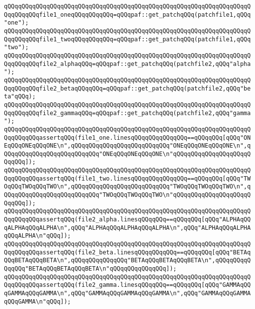 \newline
\verb|qQQqqQQqqQQqqQQqqQQqqQQqqQQqqQQqqQQqqQQqqQQqqQQqqQQqqQQqqQQqqQQqqQQqqQQqqQQqqQQqfile1_oneqQQqqQQqqQQq=qQQqpaf::get_patchqQQq(patchfile1,qQQq"one");|\newline
\verb|qQQqqQQqqQQqqQQqqQQqqQQqqQQqqQQqqQQqqQQqqQQqqQQqqQQqqQQqqQQqqQQqqQQqqQQqqQQqqQQqfile1_twoqQQqqQQqqQQq=qQQqpaf::get_patchqQQq(patchfile1,qQQq"two");|\newline
\newline
\verb|qQQqqQQqqQQqqQQqqQQqqQQqqQQqqQQqqQQqqQQqqQQqqQQqqQQqqQQqqQQqqQQqqQQqqQQqqQQqqQQqfile2_alphaqQQq=qQQqpaf::get_patchqQQq(patchfile2,qQQq"alpha");|\newline
\verb|qQQqqQQqqQQqqQQqqQQqqQQqqQQqqQQqqQQqqQQqqQQqqQQqqQQqqQQqqQQqqQQqqQQqqQQqqQQqqQQqfile2_betaqQQqqQQq=qQQqpaf::get_patchqQQq(patchfile2,qQQq"beta"qQQq);|\newline
\verb|qQQqqQQqqQQqqQQqqQQqqQQqqQQqqQQqqQQqqQQqqQQqqQQqqQQqqQQqqQQqqQQqqQQqqQQqqQQqqQQqfile2_gammaqQQq=qQQqpaf::get_patchqQQq(patchfile2,qQQq"gamma");|\newline
\newline
\verb|qQQqqQQqqQQqqQQqqQQqqQQqqQQqqQQqqQQqqQQqqQQqqQQqqQQqqQQqqQQqqQQqqQQqqQQqqQQqqQQqassertqQQq(file1_one.linesqQQqqQQqqQQqqQQq==qQQqqQQq[qQQq"ONEqQQqONEqQQqONE\n",qQQqqQQqqQQqqQQqqQQqqQQqqQQq"ONEqQQqONEqQQqONE\n",qQQqqQQqqQQqqQQqqQQqqQQqqQQq"ONEqQQqONEqQQqONE\n"qQQqqQQqqQQqqQQqqQQqqQQqqQQq]);|\newline
\verb|qQQqqQQqqQQqqQQqqQQqqQQqqQQqqQQqqQQqqQQqqQQqqQQqqQQqqQQqqQQqqQQqqQQqqQQqqQQqqQQqassertqQQq(file1_two.linesqQQqqQQqqQQqqQQq==qQQqqQQq[qQQq"TWOqQQqTWOqQQqTWO\n",qQQqqQQqqQQqqQQqqQQqqQQqqQQq"TWOqQQqTWOqQQqTWO\n",qQQqqQQqqQQqqQQqqQQqqQQqqQQq"TWOqQQqTWOqQQqTWO\n"qQQqqQQqqQQqqQQqqQQqqQQqqQQq]);|\newline
\newline
\verb|qQQqqQQqqQQqqQQqqQQqqQQqqQQqqQQqqQQqqQQqqQQqqQQqqQQqqQQqqQQqqQQqqQQqqQQqqQQqqQQqassertqQQq(file2_alpha.linesqQQqqQQq==qQQqqQQq[qQQq"ALPHAqQQqALPHAqQQqALPHA\n",qQQq"ALPHAqQQqALPHAqQQqALPHA\n",qQQq"ALPHAqQQqALPHAqQQqALPHA\n"qQQq]);|\newline
\verb|qQQqqQQqqQQqqQQqqQQqqQQqqQQqqQQqqQQqqQQqqQQqqQQqqQQqqQQqqQQqqQQqqQQqqQQqqQQqqQQqassertqQQq(file2_beta.linesqQQqqQQqqQQq==qQQqqQQq[qQQq"BETAqQQqBETAqQQqBETA\n",qQQqqQQqqQQqqQQq"BETAqQQqBETAqQQqBETA\n",qQQqqQQqqQQqqQQq"BETAqQQqBETAqQQqBETA\n"qQQqqQQqqQQqqQQq]);|\newline
\verb|qQQqqQQqqQQqqQQqqQQqqQQqqQQqqQQqqQQqqQQqqQQqqQQqqQQqqQQqqQQqqQQqqQQqqQQqqQQqqQQqassertqQQq(file2_gamma.linesqQQqqQQq==qQQqqQQq[qQQq"GAMMAqQQqGAMMAqQQqGAMMA\n",qQQq"GAMMAqQQqGAMMAqQQqGAMMA\n",qQQq"GAMMAqQQqGAMMAqQQqGAMMA\n"qQQq]);|\newline
